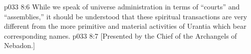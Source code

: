 \vs p033 8:6 While we speak of universe administration in terms of “courts” and “assemblies,” it should be understood that these spiritual transactions are very different from the more primitive and material activities of Urantia which bear corresponding names.
\vsetoff
\vs p033 8:7 [Presented by the Chief of the Archangels of Nebadon.]
